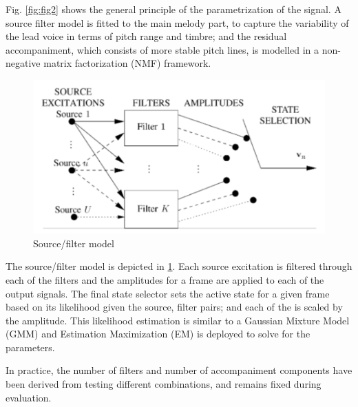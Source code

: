 \documentclass[12pt,journal,compsoc]{IEEEtran}
\begin{document}
Fig. \ref{fig:fig2} shows the general principle of the parametrization of the signal. A source filter model is fitted to the main melody part, to capture the variability of the lead voice in terms of pitch range and timbre; and the residual accompaniment, which consists of more stable pitch lines, is modelled in a non-negative matrix factorization (NMF) framework.

\begin{figure}[H]
\includegraphics[scale=0.2]{images/fig3}
    \caption{Source/filter model}
    \label{fig:fig3}
\end{figure}

The source/filter model is depicted in \ref{fig:fig3}. Each source excitation is filtered through each of the filters and the amplitudes for a frame are applied to each of the output signals. The final state selector sets the active state for a given frame based on its likelihood given the source, filter pairs; and each of the is scaled by the amplitude. This likelihood estimation is similar to a Gaussian Mixture Model (GMM) and Estimation Maximization (EM) is deployed to solve for the parameters.

In practice, the number of filters and number of accompaniment components have been derived from testing different combinations, and remains fixed during evaluation.
\end{document}
